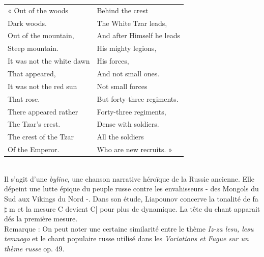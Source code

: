 \begin{tabular}{ll}
\hspace{-3.9mm}« Out of the woods
&
Behind the crest
\\
  \quad{}Dark woods.
&
  \quad{}The White Tzar leads,
\\
Out of the mountain,
&
And after Himself he leads
\\
  \quad{}Steep mountain.
&
  \quad{}His mighty legions,
\\
It was not the white dawn
&
His forces,
\\
  \quad{}That appeared,
&
  \quad{}And not small ones.
\\
It was not the red sun
&
Not small forces
\\
  \quad{}That rose.
&
  \quad{}But forty-three regiments.
\\
There appeared rather
&
Forty-three regiments,
\\
  \quad{}The Tzar’s crest.
&
  \quad{}Dense with soldiers.
\\
The crest of the Tzar
&
All the soldiers
\\
  \quad{}Of the Emperor.
&
  \quad{}Who are new recruits. »
\end{tabular}\\

Il s'agit d'une \emph{byline}, une chanson narrative héroïque de la Russie ancienne. Elle dépeint une lutte épique du peuple russe contre les envahisseurs - des Mongols du Sud aux Vikings du Nord -. Dans son étude, Liapounov concerve la tonalité de fa$\sharp$ m et la mesure C devient C\hspace{-2mm}| pour plus de dynamique. La tête du chant apparait dés la première mesure.\\

Remarque : On peut noter une certaine similarité entre le thème \emph{Iz-za lesu, lesu temnogo} et le chant populaire russe utilisé dans les \emph{Variations et Fugue sur un thème russe} op. 49.

